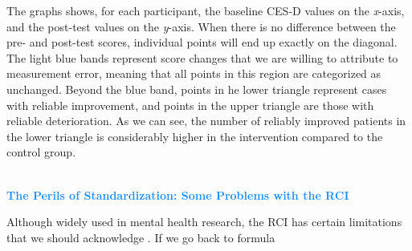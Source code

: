 The graphs shows, for each participant, the baseline CES-D values on the \emph{x}-axis, and the post-test values on the \emph{y}-axis. When there is no difference between the pre- and post-test scores, individual points will end up exactly on the diagonal. The light blue bands represent score changes that we are willing to attribute to measurement error, meaning that all points in this region are categorized as unchanged. Beyond the blue band, points in he lower triangle represent cases with reliable improvement, and points in the upper triangle are those with reliable deterioration. As we can see, the number of reliably improved patients in the lower triangle is considerably higher in the intervention compared to the control group.

\begin{box-info} \\
\textcolor{dodgerblue}{\textbf{The Perils of Standardization: Some Problems with the RCI }} 

\vspace{2mm}

Although widely used in mental health research, the RCI has certain limitations that we should acknowledge \citep{wise2004methods, mcaleavey2021not}. If we go back to formula

\end{box-info}
